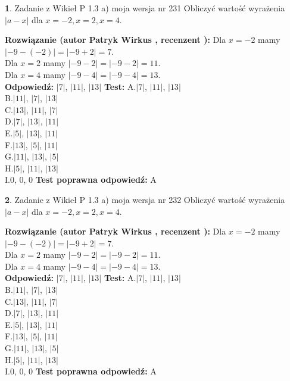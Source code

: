 \documentclass[12pt, a4paper]{article}
\theoremstyle{definition} %
\newtheorem{zad}{}
\newcommand{\zadStart}[1]{\begin{zad}#1\newline}
\newcommand{\zadStop}{\end{zad}}
\newcommand{\rozwStart}[2]{\noindent \textbf{Rozwiązanie (autor #1 , recenzent #2): }\newline}
\newcommand{\rozwStop}{\newline}
\newcommand{\odpStart}{\noindent \textbf{Odpowiedź:}\newline}
\newcommand{\odpStop}{\newline}
\newcommand{\testStart}{\noindent \textbf{Test:}\newline}
\newcommand{\testStop}{\newline}
\newcommand{\kluczStart}{\noindent \textbf{Test poprawna odpowiedź:}\newline}
\newcommand{\kluczStop}{\newline}
\begin{document}
\zadStart{Zadanie z Wikieł P 1.3 a) moja wersja nr 231}
Obliczyć wartość wyrażenia $|a - x|$ dla $x=-2,x=2,x=4$.
\zadStop
\rozwStart{Patryk Wirkus}{}
Dla $x = -2$ mamy $|-9 - (-2)| = |-9 + 2| = 7$.\\
Dla $x = 2$ mamy $|-9 - 2| = |-9 - 2| = 11$.\\
Dla $x = 4$ mamy $|-9 - 4| = |-9 - 4| = 13$.\\
\rozwStop
\odpStart
$|7|$, $|11|$, $|13|$
\odpStop
\testStart
A.$|7|$, $|11|$, $|13|$\\
B.$|11|$, $|7|$, $|13|$\\
C.$|13|$, $|11|$, $|7|$\\
D.$|7|$, $|13|$, $|11|$\\
E.$|5|$, $|13|$, $|11|$\\
F.$|13|$, $|5|$, $|11|$\\
G.$|11|$, $|13|$, $|5|$\\
H.$|5|$, $|11|$, $|13|$\\
I.$0$, $0$, $0$
\testStop
\kluczStart
A
\kluczStop



\zadStart{Zadanie z Wikieł P 1.3 a) moja wersja nr 232}
Obliczyć wartość wyrażenia $|a - x|$ dla $x=-2,x=2,x=4$.
\zadStop
\rozwStart{Patryk Wirkus}{}
Dla $x = -2$ mamy $|-9 - (-2)| = |-9 + 2| = 7$.\\
Dla $x = 2$ mamy $|-9 - 2| = |-9 - 2| = 11$.\\
Dla $x = 4$ mamy $|-9 - 4| = |-9 - 4| = 13$.\\
\rozwStop
\odpStart
$|7|$, $|11|$, $|13|$
\odpStop
\testStart
A.$|7|$, $|11|$, $|13|$\\
B.$|11|$, $|7|$, $|13|$\\
C.$|13|$, $|11|$, $|7|$\\
D.$|7|$, $|13|$, $|11|$\\
E.$|5|$, $|13|$, $|11|$\\
F.$|13|$, $|5|$, $|11|$\\
G.$|11|$, $|13|$, $|5|$\\
H.$|5|$, $|11|$, $|13|$\\
I.$0$, $0$, $0$
\testStop
\kluczStart
A
\kluczStop
\end{document}
